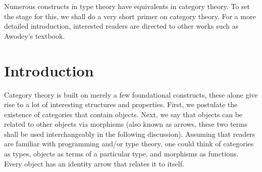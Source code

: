 \documentclass[12pt,twoside,maitrise]{dms}
\theoremstyle{definition}
\numberwithin{equation}{section}
\numberwithin{table}{chapter}
\numberwithin{figure}{chapter}
\begin{document}

Numerous constructs in type theory have equivalents in category theory. To set
the stage for this, we shall do a very short primer on category theory. For a
more detailed introduction, interested readers are directed to other works such
as Awodey's textbook\cite{awodey-cattheory}.

\section{Introduction}
Category theory is built on merely a few foundational constructs, these alone
give rise to a lot of interesting structures and properties. First, we postulate
the existence of categories that contain objects. Next, we say that objects can
be related to other objects via morphisms (also known as arrows, these two terms
shall be used interchangeably in the following discussion). Assuming that
readers are familiar with programming and/or type theory, one could think of
categories as types, objects as terms of a particular type, and morphisms as
functions. Every object has an identity arrow that relates it to itself.
\end{document}
